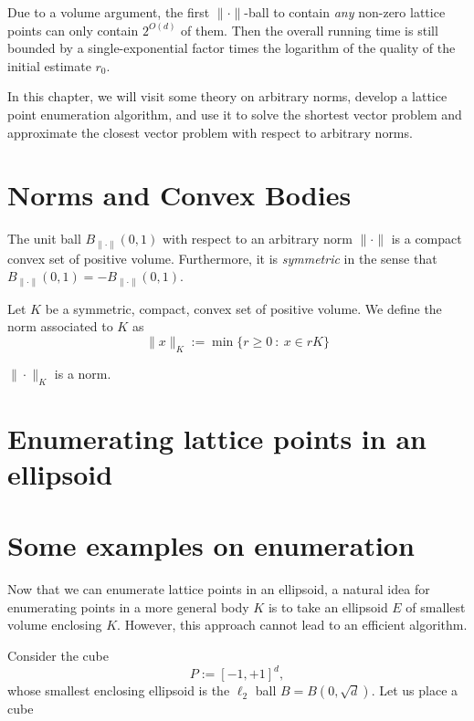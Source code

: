 Due to a volume argument,
the first $\|\cdot\|$-ball to contain \emph{any} non-zero lattice points
can only contain $2^{O(d)}$ of them.
Then the overall running time is still bounded by a single-exponential factor
times the logarithm of the quality of the initial estimate $r_0$.

In this chapter,
we will visit some theory on arbitrary norms,
develop a lattice point enumeration algorithm,
and use it to solve the shortest vector problem
and approximate the closest vector problem
with respect to arbitrary norms.


\section{Norms and Convex Bodies}

The unit ball
$B_{\|\cdot\|}(0,1)$
with respect to an arbitrary norm $\|\cdot\|$
is a compact convex set of positive volume.
Furthermore, it is \emph{symmetric}
in the sense that $B_{\|\cdot\|}(0,1) = -B_{\|\cdot\|}(0,1)$.

\begin{definition}
  Let $K$ be a symmetric, compact, convex set of positive volume.
  We define the norm associated to $K$ as
  \[
    \| x \|_K := \min\{ r \geq 0 ~:~ x \in r K \}
  \]
\end{definition}
\begin{lemma}
  $\|\cdot\|_K$ is a norm.
\end{lemma}



\section{Enumerating lattice points in an ellipsoid}



\section{Some examples on enumeration}

Now that we can enumerate lattice points in an ellipsoid,
a natural idea for enumerating points in a more general body $K$
is to take an ellipsoid $E$ of smallest volume enclosing $K$.
However, this approach cannot lead to an efficient algorithm.

Consider the cube
\[
  P := [-1, +1]^d,
\]
whose smallest enclosing ellipsoid is the $\ell_2$ ball $B = B(0,\sqrt{d})$.
Let us place a cube


